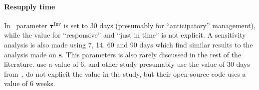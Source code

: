 
\paragraph{Resupply time}
\label{sec:resupply-time-param}

In~\textcite{hallegatte-2013-model-role} parameter
$\bm{\tau}^{\textrm{Inv}}$ is set to 30 days (presumably for ``anticipatory''
management), while the value for ``responsive'' and ``just in time''
is not explicit. A sensitivity analysis is also made using 7, 14, 60 and 90
days which find similar results to the analysis made on $\bm{s}$. This
parameters is also rarely discussed in the rest of the literature.
\Textcite{inoue-2018-firm-simul} use a value of 6, and other study presumably
use the value of 30 days from~\textcite{hallegatte-2013-model-role}.
\Textcite{guan-2020-global-suppl} do not explicit
the value in the study, but their open-source code uses a value of 6 weeks.



